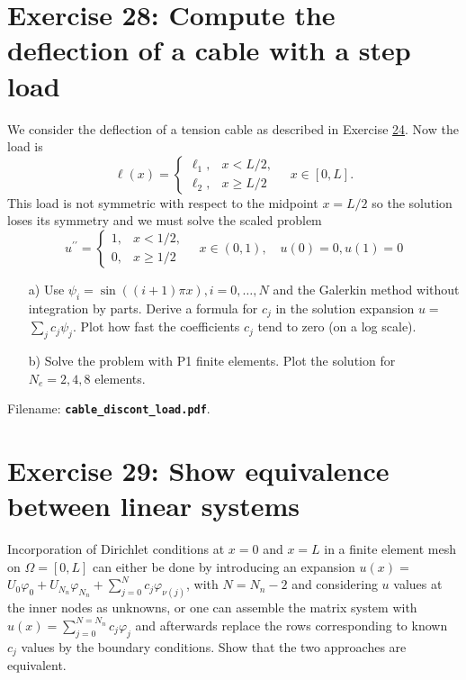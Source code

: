 \documentclass[../main.tex]{subfiles}
\begin{document}
	\section*{Exercise 28: Compute the deflection of a cable with a step load}
		\noindent We consider the deflection of a tension cable as described in Exercise \hyperref[sec:sec_21_24]{24}. Now the load is
		$$
		\ell(x)=\left\{\begin{array}{ll}
			\ell_{1}, & x<L / 2, \\
			\ell_{2}, & x \geq L / 2
		\end{array} \quad x \in[0, L] .\right.
		$$
		This load is not symmetric with respect to the midpoint $x=L / 2$ so the solution loses its symmetry and we must solve the scaled problem
		$$
		u^{\prime \prime}=\left\{\begin{array}{ll}
			1, & x<1 / 2, \\
			0, & x \geq 1 / 2
		\end{array} \quad x \in(0,1), \quad u(0)=0, u(1)=0\right.
		$$
		\begin{enumerate}
			\item[a)] Use $\psi_{i}=\sin ((i+1) \pi x), i=0, \ldots, N$ and the Galerkin method without integration by parts. Derive a formula for $c_{j}$ in the solution expansion $u=$ $\sum_{j} c_{j} \psi_{j}$. Plot how fast the coefficients $c_{j}$ tend to zero (on a log scale).
			\item[b)]Solve the problem with P1 finite elements. Plot the solution for $N_{e}=2,4,8$ elements.
		\end{enumerate}
		Filename: \textbf{\texttt{cable\_discont\_load.pdf}}.\bigbreak
	\section*{Exercise 29: Show equivalence between linear systems}
		\noindent Incorporation of Dirichlet conditions at $x=0$ and $x=L$ in a finite element mesh on $\Omega=[0, L]$ can either be done by introducing an expansion $u(x)=$ $U_{0} \varphi_{0}+U_{N_{n}} \varphi_{N_{n}}+\sum_{j=0}^{N} c_{j} \varphi_{\nu(j)}$, with $N=N_{n}-2$ and considering $u$ values at the inner nodes as unknowns, or one can assemble the matrix system with $u(x)=\sum_{j=0}^{N=N_{n}} c_{j} \varphi_{j}$ and afterwards replace the rows corresponding to known $c_{j}$ values by the boundary conditions. Show that the two approaches are equivalent.\bigbreak
\end{document}
